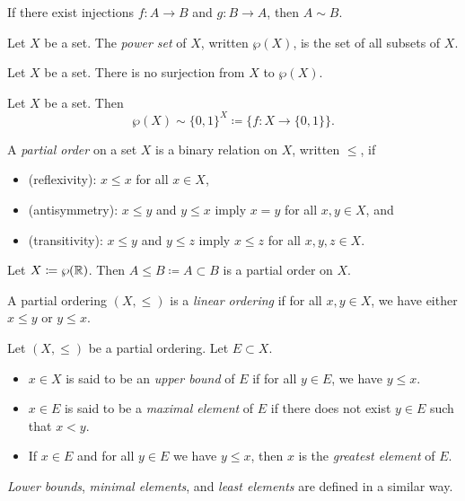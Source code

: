 \documentclass{techreport}
\begin{document}
\begin{theorem}
	If there exist injections $f:A \to B$ and $g : B \to A$, then $A \sim B$.
\end{theorem}

\begin{definition}
	Let $X$ be a set.
	The \emph{power set} of $X$, written $\wp(X)$, is the set of all subsets of $X$.
\end{definition}

\begin{lemma}[Cantor]
	Let $X$ be a set. There is no surjection from $X$ to $\wp(X)$.
\end{lemma}

\begin{proposition}
	Let $X$ be a set. Then
	\[
	\wp(X) \sim \{0,1\}^X \coloneqq \{ f : X \to \{0,1\} \}.
	\]
\end{proposition}

\begin{definition}
	A \emph{partial order} on a set $X$ is a binary relation on $X$, written ${\le}$, if
	\begin{itemize}
		\item (reflexivity): $x \le x$ for all $x \in X$,
		\item (antisymmetry): $x \le y$ and $y \le x$ imply $x = y$ for all $x,y \in X$, and
		\item (transitivity): $x \le y$ and $y \le z$ imply $x \le z$ for all $x,y,z \in X$.
	\end{itemize}
\end{definition}

\begin{example}
	Let $X \coloneqq \wp(\mathbb{R})$.
	Then $A \le B \coloneqq A \subset B$ is a partial order on $X$.
\end{example}

\begin{definition}
	A partial ordering $(X,{\le})$ is a \emph{linear ordering} if for all $x,y \in X$, we have either $x \le y$ or $y \le x$.
\end{definition}

\begin{definition}
	Let $(X,{\le})$ be a partial ordering.
	Let $E \subset X$.
	\begin{itemize}
		\item $x \in X$ is said to be an \emph{upper bound} of $E$ if for all $y \in E$, we have $y \le x$.
		\item $x \in E$ is said to be a \emph{maximal element} of $E$ if there does not exist $y \in E$ such that $x < y$.
		\item If $x \in E$ and for all $y \in E$ we have $y \le x$, then $x$ is the \emph{greatest element} of $E$.
	\end{itemize}
	\emph{Lower bounds}, \emph{minimal elements}, and \emph{least elements} are defined in a similar way.
\end{definition}
\end{document}
